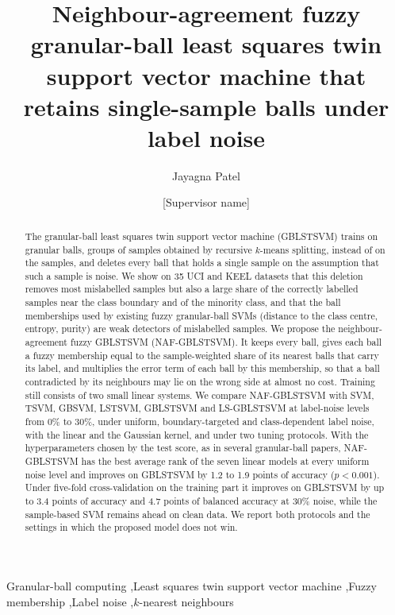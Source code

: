 \documentclass[preprint,12pt]{elsarticle}
\newcommand{\NAF}{NAF-GBLSTSVM}
\begin{document}
\begin{frontmatter}

\title{Neighbour-agreement fuzzy granular-ball least squares twin support vector machine that retains single-sample balls under label noise}

\author[inst1]{Jayagna Patel}
\author[inst1]{[Supervisor name]}
\address[inst1]{[Department], Birla Institute of Technology and Science, Pilani, India}

\begin{abstract}
The granular-ball least squares twin support vector machine (GBLSTSVM) trains on granular balls, groups of samples obtained by recursive $k$-means splitting, instead of on the samples, and deletes every ball that holds a single sample on the assumption that such a sample is noise. We show on 35 UCI and KEEL datasets that this deletion removes most mislabelled samples but also a large share of the correctly labelled samples near the class boundary and of the minority class, and that the ball memberships used by existing fuzzy granular-ball SVMs (distance to the class centre, entropy, purity) are weak detectors of mislabelled samples. We propose the neighbour-agreement fuzzy GBLSTSVM (\NAF{}). It keeps every ball, gives each ball a fuzzy membership equal to the sample-weighted share of its nearest balls that carry its label, and multiplies the error term of each ball by this membership, so that a ball contradicted by its neighbours may lie on the wrong side at almost no cost. Training still consists of two small linear systems. We compare \NAF{} with SVM, TSVM, GBSVM, LSTSVM, GBLSTSVM and LS-GBLSTSVM at label-noise levels from 0\% to 30\%, under uniform, boundary-targeted and class-dependent label noise, with the linear and the Gaussian kernel, and under two tuning protocols. With the hyperparameters chosen by the test score, as in several granular-ball papers, \NAF{} has the best average rank of the seven linear models at every uniform noise level and improves on GBLSTSVM by 1.2 to 1.9 points of accuracy ($p<0.001$). Under five-fold cross-validation on the training part it improves on GBLSTSVM by up to 3.4 points of accuracy and 4.7 points of balanced accuracy at 30\% noise, while the sample-based SVM remains ahead on clean data. We report both protocols and the settings in which the proposed model does not win.
\end{abstract}

\begin{keyword}
Granular-ball computing \sep Least squares twin support vector machine \sep Fuzzy membership \sep Label noise \sep $k$-nearest neighbours
\end{keyword}

\end{frontmatter}
\end{document}
